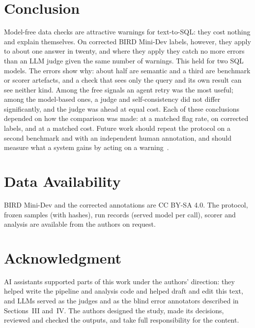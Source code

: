 \documentclass[conference]{IEEEtran}
\begin{document}
\section{Conclusion}

Model-free data checks are attractive warnings for text-to-SQL: they cost nothing and explain
themselves. On corrected BIRD Mini-Dev labels, however, they apply to about one answer in twenty, and
where they apply they catch no more errors than an LLM judge given the same number of warnings. This
held for two SQL models. The errors show why: about half are semantic and a third are benchmark or
scorer artefacts, and a check that sees only the query and its own result can see neither kind. Among
the free signals an agent retry was the most useful; among the model-based ones, a judge and
self-consistency did not differ significantly, and the judge was ahead at equal cost. Each of these
conclusions depended on how the comparison was made: at a matched flag rate, on corrected labels, and
at a matched cost. Future work should repeat the protocol on a second benchmark and with an
independent human annotation, and should measure what a system gains by acting on a
warning~\cite{companion2026decisions}.

\section*{Data Availability}
BIRD Mini-Dev and the corrected annotations are CC BY-SA 4.0. The protocol, frozen samples (with hashes), run
records (served model per call), scorer and analysis are available from the authors on request.

\section*{Acknowledgment}
AI assistants supported parts of this work under the authors' direction: they helped write the
pipeline and analysis code and helped draft and edit this text, and LLMs served as the judges and as the
blind error annotators described in Sections~III and~IV. The authors designed the study, made its decisions,
reviewed and checked the outputs, and take full responsibility for the content.



\end{document}
